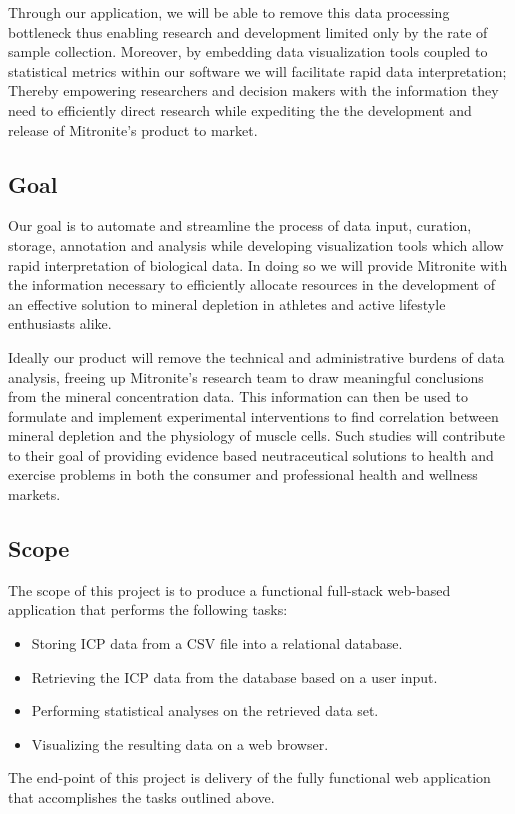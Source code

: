 \documentclass[10pt,twocolumn,letterpaper]{article}
\begin{document}
            Through our application, we will be able to remove this data processing bottleneck thus enabling research and development limited only by the rate of sample collection. Moreover, by embedding data visualization tools coupled to statistical metrics within our software we will facilitate rapid data interpretation; Thereby empowering researchers and decision makers with the information they need to efficiently direct research while expediting the the development and release of Mitronite's product to market.

            \subsection{Goal}

            Our goal is to automate and streamline the process of data input, curation, storage, annotation and analysis while developing visualization tools which allow rapid interpretation of biological data. In doing so we will provide Mitronite with the information necessary to efficiently allocate resources in the development of an effective solution to mineral depletion in athletes and active lifestyle enthusiasts alike.

            Ideally our product will remove the technical and administrative burdens of data analysis, freeing up Mitronite's research team to draw meaningful conclusions from the mineral concentration data. This information can then be used to formulate and implement experimental interventions to find correlation between mineral depletion and the physiology of muscle cells. Such studies will contribute to their goal of providing evidence based neutraceutical solutions to health and exercise problems in both the consumer and professional health and wellness markets.

            \subsection{Scope}
            The scope of this project is to produce a functional full-stack web-based application that performs the following tasks:
            \begin{itemize}
                  \item Storing ICP data from a CSV file into a relational database.
                  \item Retrieving the ICP data from the database based on a user input.
                  \item Performing statistical analyses on the retrieved data set.
                  \item Visualizing the resulting data on a web browser.
            \end{itemize}
            The end-point of this project is delivery of the fully functional web application that accomplishes the tasks outlined above.
\end{document}
